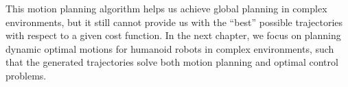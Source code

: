 \bigskip

This motion planning algorithm helps us achieve global planning in
complex environments, but it still cannot provide us with the ``best''
possible trajectories with respect to a given cost function. In the
next chapter, we focus on planning dynamic optimal motions for
humanoid robots in complex environments, such that the generated
trajectories solve both motion planning and optimal control problems.
